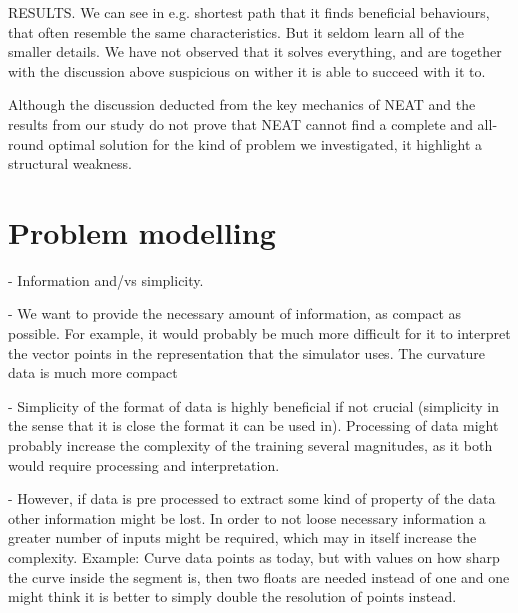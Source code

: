 


RESULTS. We can see in e.g. shortest path that it finds beneficial behaviours, that often resemble the same characteristics. But it seldom learn all of the smaller details. We have not observed that it solves everything, and are together with the discussion above suspicious on wither it is able to succeed with it to.

Although the discussion deducted from the key mechanics of NEAT and the results from our study do not prove that NEAT cannot find a complete and all-round optimal solution for the kind of problem we investigated, it highlight a structural weakness.



\section{Problem modelling}
- Information and/vs simplicity. 

- We want to provide the necessary amount of information, as compact as possible. For example, it would probably be much more difficult for it to interpret the vector points in the representation that the simulator uses. The curvature data is much more compact

- Simplicity of the format of data is highly beneficial if not crucial (simplicity in the sense that it is close the format it can be used in). Processing of data might probably increase the complexity of the training several magnitudes, as it both would require processing and interpretation.

- However, if data is pre processed to extract some kind of property of the data other information might be lost. In order to not loose necessary information a greater number of inputs might be required, which may in itself increase the complexity. Example: Curve data points as today, but with values on how sharp the curve inside the segment is, then two floats are needed instead of one and one might think it is better to simply double the resolution of points instead.

